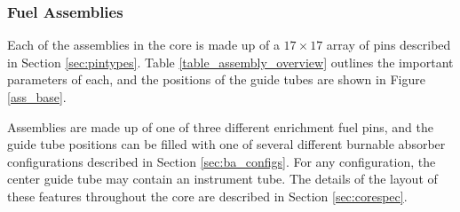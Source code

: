 \clearpage
\subsubsection[Fuel Assemblies]{Fuel Assemblies\texorpdfstring{\protect{}}{}}



Each of the assemblies in the core is made up of a $17\times17$ array of pins
described in Section \ref{sec:pintypes}. Table \ref{table_assembly_overview}
outlines the important parameters of each, and the positions of the guide tubes
are shown in Figure \ref{ass_base}.

Assemblies are made up of one of three different enrichment fuel pins, and the
guide tube positions can be filled with one of several different burnable
absorber configurations described in Section \ref{sec:ba_configs}. For any
configuration, the center guide tube may contain an instrument tube. The details
of the layout of these features throughout the core are described in Section
\ref{sec:corespec}.

